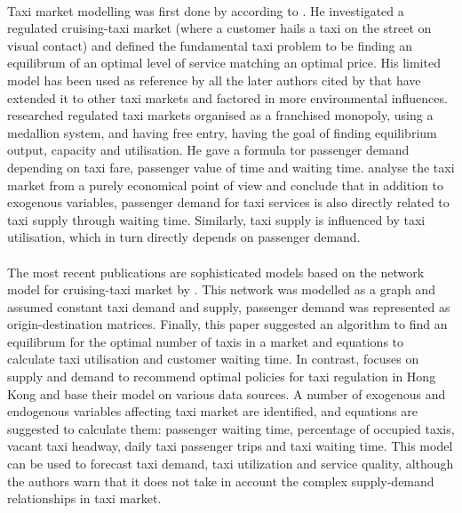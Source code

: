 \paragraph{}Taxi market modelling was first done by \textcite{Douglas1972taxi+regulation} according to \textcite{Salanova2011taxi+review}. He investigated a regulated cruising-taxi market (where a customer hails a taxi on the street on visual contact) and defined the fundamental taxi problem to be finding an equilibrum of an optimal level of service matching an optimal price. His limited model has been used as reference by all the later authors cited by \textcite{Salanova2011taxi+review} that have extended it to other taxi markets and factored in more environmental influences. \textcite{Devany1975taxi+capacity} researched regulated taxi markets organised as a franchised monopoly, using a medallion system, and having free entry, having the goal of finding equilibrium output, capacity and utilisation. He gave a formula tor passenger demand depending on taxi fare, passenger value of time and waiting time. \textcite{Manski1967taxi+demand} analyse the taxi market from a purely economical point of view and conclude that in addition to exogenous variables, passenger demand for taxi services is also directly related to taxi supply through waiting time. Similarly, taxi supply is influenced by taxi utilisation, which in turn directly depends on passenger demand.
\paragraph{}The most recent publications are sophisticated models based on the network model for cruising-taxi market by \textcite{Yang1998taxi+network}. This network was modelled as a graph and assumed constant taxi demand and supply, passenger demand was represented as origin-destination matrices. Finally, this paper suggested an algorithm to find an equilibrum for the optimal number of taxis in a market and equations to calculate taxi utilisation and customer waiting time. In contrast, \textcite{Yang2000taxi+utilization} focuses on supply and demand to recommend optimal policies for taxi regulation in Hong Kong and base their model on various data sources. A number of exogenous and endogenous variables affecting taxi market are identified, and equations are suggested to calculate them: passenger waiting time, percentage of occupied taxis, vacant taxi headway, daily taxi passenger trips and taxi waiting time. This model can be used to forecast taxi demand, taxi utilization and service quality, although the authors warn that it does not take in account the complex supply-demand relationships in taxi market.
